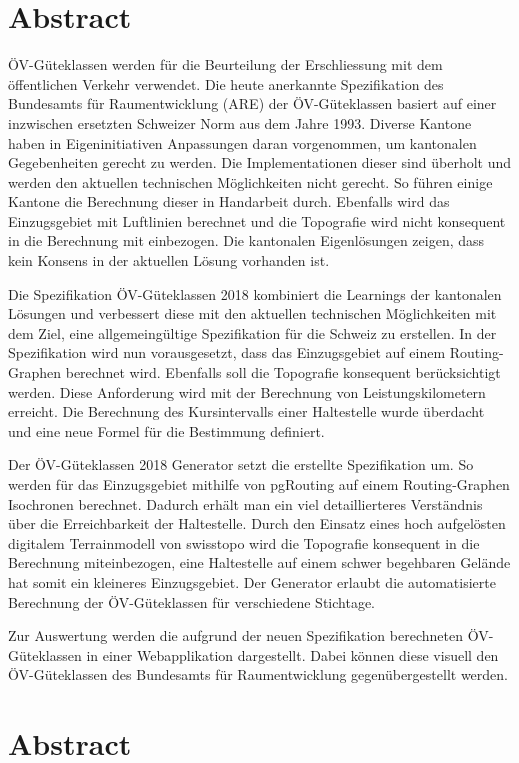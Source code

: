 
\chapter*{Abstract}
ÖV-Güteklassen werden für die Beurteilung der Erschliessung mit dem öffentlichen Verkehr verwendet.
Die heute anerkannte Spezifikation des Bundesamts für Raumentwicklung (ARE) der ÖV-Güteklassen basiert auf einer inzwischen ersetzten Schweizer Norm aus dem Jahre 1993.
Diverse Kantone haben in Eigeninitiativen Anpassungen daran vorgenommen, um kantonalen Gegebenheiten gerecht zu werden.
Die Implementationen dieser sind überholt und werden den aktuellen technischen Möglichkeiten nicht gerecht.
So führen einige Kantone die Berechnung dieser in Handarbeit durch.
Ebenfalls wird das Einzugsgebiet mit Luftlinien berechnet und die Topografie wird nicht konsequent in die Berechnung mit einbezogen.
Die kantonalen Eigenlösungen zeigen, dass kein Konsens in der aktuellen Lösung vorhanden ist.

Die Spezifikation ÖV-Güteklassen 2018 kombiniert die Learnings der kantonalen Lösungen und verbessert diese mit den aktuellen technischen Möglichkeiten mit dem Ziel, eine allgemeingültige Spezifikation für die Schweiz zu erstellen.
In der Spezifikation wird nun vorausgesetzt, dass das Einzugsgebiet auf einem Routing-Graphen berechnet wird.
Ebenfalls soll die Topografie konsequent berücksichtigt werden.
Diese Anforderung wird mit der Berechnung von Leistungskilometern erreicht.
Die Berechnung des Kursintervalls einer Haltestelle wurde überdacht und eine neue Formel für die Bestimmung definiert.

Der ÖV-Güteklassen 2018 Generator setzt die erstellte Spezifikation um.
So werden für das Einzugsgebiet mithilfe von pgRouting auf einem Routing-Graphen Isochronen berechnet.
Dadurch erhält man ein viel detaillierteres Verständnis über die Erreichbarkeit der Haltestelle.
Durch den Einsatz eines hoch aufgelösten digitalem Terrainmodell von swisstopo wird die Topografie konsequent in die Berechnung miteinbezogen, eine Haltestelle auf einem schwer begehbaren Gelände hat somit ein kleineres Einzugsgebiet.
Der Generator erlaubt die automatisierte Berechnung der ÖV-Güteklassen für verschiedene Stichtage.

Zur Auswertung werden die aufgrund der neuen Spezifikation berechneten ÖV-Güteklassen in einer Webapplikation dargestellt.
Dabei können diese visuell den ÖV-Güteklassen des Bundesamts für Raumentwicklung gegenübergestellt werden.




\cleardoublepage

\chapter*{Abstract}

